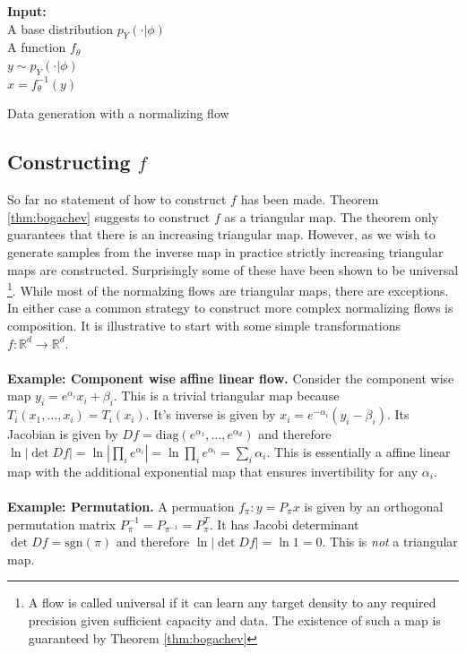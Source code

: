 \documentclass[12pt,a4paper]{article}
\begin{document}
\begin{algorithm}[t] \label{algo:normalizing_flow_generation}
	\SetAlgoLined
	\textbf{Input:} \\ 
	\quad A base distribution $p_Y(\cdot|\phi)$ \\
	\quad A function $f_\theta$ \\
	{
	$y \sim p_Y(\cdot|\phi)$  \\
	$x = f^{-1}_\theta(y)$
}
	\caption{Data generation with a normalizing flow}
\end{algorithm} 
\subsection{Constructing $f$}
So far no statement of how to construct $f$ has been made. Theorem \ref{thm:bogachev} suggests to construct $f$ as a triangular map. The theorem only guarantees that there is an increasing triangular map. However, as we wish to generate samples from the inverse map in practice strictly increasing triangular maps are constructed. Surprisingly some of these have been shown to be universal \cite{jaini_polynomial_flow_2019, huang_2018_neural_autoregressive_flows}\footnote{A flow is called universal if it can learn any target density to any required precision given sufficient capacity and data. The existence of such a map is guaranteed by Theorem \ref{thm:bogachev}}. 
While most of the normalzing flows are triangular maps, there are exceptions. In either case a common strategy to construct more complex normalizing flows is composition. It is illustrative to start with some simple transformations $f: \mathbb{R}^d \rightarrow \mathbb{R}^d$.
\\
\\
\textbf{Example: Component wise affine linear flow.} Consider the component wise map $y_i = e^{\alpha_i} x_i + \beta_i$. This is a trivial triangular map because $T_i(x_1, \dots, x_i) = T_i(x_i)$. It's inverse is given by $x_i = e^{-\alpha_i} (y_i - \beta_i)$. Its Jacobian is given by $Df = \text{diag}(e^{\alpha_1}, \dots, e^{\alpha_d})$ and therefore $\ln |\det Df| = \ln |\prod_i e^{\alpha_i}| = \ln \prod_i e^{\alpha_i} = \sum_i \alpha_i$. This is essentially a affine linear map with the additional exponential map that ensures invertibility for any $\alpha_i$. \\ \\
\textbf{Example: Permutation.}
A permuation $f_\pi: y = P_\pi x$ is given by an orthogonal permutation matrix $P^{-1}_\pi =P_{\pi^{-1}} = P^{T}_\pi$. It has Jacobi determinant $\det Df = \text{sgn}(\pi)$ and therefore $\ln |\det Df| = \ln 1 = 0$. This is \textit{not} a triangular map. 
\end{document}
